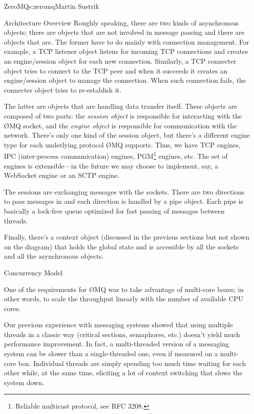 \begin{aosachapter}{ZeroMQ}{s:zeromq}{Martin Sustrik}
\begin{aosasect1}{Architecture Overview}
Roughly speaking, there are two kinds of asynchronous objects; there
are objects that are not involved in message passing and there are
objects that are.  
The former have to do mainly with connection management. For example,
a TCP listener object listens for incoming TCP connections and creates
an engine/session object for each new connection. Similarly, a TCP
connecter object tries to connect to the TCP peer and when it succeeds
it creates an engine/session object to manage the connection. When
such connection fails, the connecter object tries to re-establish it.

The latter are objects that are handling data transfer itself. These
objects are composed of two parts: the \emph{session object} is responsible for
interacting with the {\O}MQ socket, and the \emph{engine object} is responsible for
communication with the network. There's only one kind of the session
object, but there's a different engine type for each underlying
protocol {\O}MQ supports. Thus, we have TCP engines, IPC (inter-process
communication) engines, PGM\footnote{Reliable multicast protocol, see RFC 3208.}
engines, etc. The set of engines is extensible---in the future we may
choose to implement, say, a WebSocket engine or an SCTP engine.

The sessions are exchanging messages with the sockets. There are two
directions to pass messages in and each direction is handled by a pipe
object. Each pipe is basically a lock-free queue optimized for fast passing
of messages between threads.

Finally, there's a context object (discussed in the previous sections but
not shown on the diagram) that holds the global state and is
accessible by all the sockets and all the asynchronous objects.

\end{aosasect1}

\begin{aosasect1}{Concurrency Model}

One of the requirements for {\O}MQ was to take advantage of multi-core
boxes; in other words, to scale the throughput linearly with the number of
available CPU cores.

Our previous experience with messaging systems showed that using
multiple threads in a classic way (critical sections, semaphores, etc.)
doesn't yield much performance improvement. In fact, a multi-threaded
version of a messaging system can be slower than a single-threaded
one, even if measured on a multi-core box. Individual threads are
simply spending too much time waiting for each other while, at the
same time, eliciting a lot of context switching that slows the system
down.


\end{aosasect1}
\end{aosachapter}
